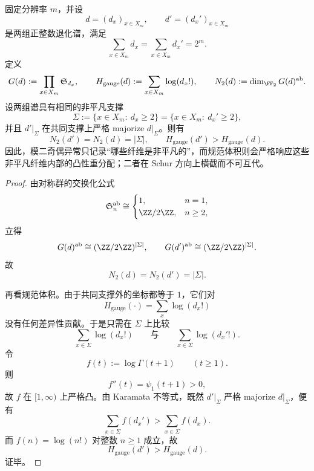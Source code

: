 \begin{proposition}\label{prop:xi-time-part60abb-gauge-volume-parity-transverse-separation}
固定分辨率 \(m\)，并设
\[
d=(d_x)_{x\in X_m},
\qquad
d'=(d_x')_{x\in X_m}
\]
是两组正整数退化谱，满足
\[
\sum_{x\in X_m}d_x=\sum_{x\in X_m}d_x'=2^m.
\]
定义
\[
G(d):=\prod_{x\in X_m}\mathfrak S_{d_x},
\qquad
H_{\mathrm{gauge}}(d):=\sum_{x\in X_m}\log(d_x!),
\qquad
N_2(d):=\dim_{\FF_2}G(d)^{\mathrm{ab}}.
\]
设两组谱具有相同的非平凡支撑
\[
\Sigma:=\{x\in X_m:\ d_x\ge 2\}=\{x\in X_m:\ d_x'\ge 2\},
\]
并且 \(d'|_\Sigma\) 在共同支撑上严格 majorize \(d|_\Sigma\)。则有
\[
N_2(d')=N_2(d)=|\Sigma|,
\qquad
H_{\mathrm{gauge}}(d')>H_{\mathrm{gauge}}(d).
\]
因此，模二奇偶异常只记录“哪些纤维是非平凡的”，而规范体积则会严格响应这些非平凡纤维内部的凸性重分配；二者在 Schur 方向上横截而不可互代。
\end{proposition}
\begin{proof}
由对称群的交换化公式
\[
\mathfrak S_n^{\mathrm{ab}}
\cong
\begin{cases}
1,& n=1,\\
\ZZ/2\ZZ,& n\ge 2,
\end{cases}
\]
立得
\[
G(d)^{\mathrm{ab}}
\cong
(\ZZ/2\ZZ)^{|\Sigma|},
\qquad
G(d')^{\mathrm{ab}}
\cong
(\ZZ/2\ZZ)^{|\Sigma|}.
\]
故
\[
N_2(d)=N_2(d')=|\Sigma|.
\]

再看规范体积。由于共同支撑外的坐标都等于 \(1\)，它们对
\[
H_{\mathrm{gauge}}(\cdot)=\sum_x\log(d_x!)
\]
没有任何差异性贡献。于是只需在 \(\Sigma\) 上比较
\[
\sum_{x\in\Sigma}\log(d_x!)
\qquad\text{与}\qquad
\sum_{x\in\Sigma}\log(d_x'!).
\]
令
\[
f(t):=\log\Gamma(t+1)
\qquad (t\ge 1).
\]
则
\[
f''(t)=\psi_1(t+1)>0,
\]
故 \(f\) 在 \([1,\infty)\) 上严格凸。由 Karamata 不等式，既然 \(d'|_\Sigma\) 严格 majorize \(d|_\Sigma\)，便有
\[
\sum_{x\in\Sigma}f(d_x')>\sum_{x\in\Sigma}f(d_x).
\]
而 \(f(n)=\log(n!)\) 对整数 \(n\ge 1\) 成立，故
\[
H_{\mathrm{gauge}}(d')>H_{\mathrm{gauge}}(d).
\]
证毕。
\end{proof}

\endinput
